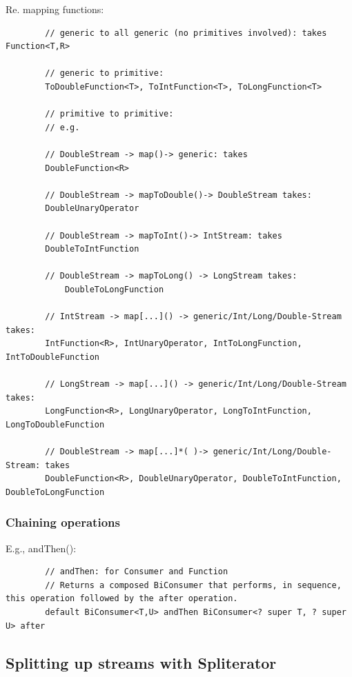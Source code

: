 \documentclass{scrartcl}
\begin{document}
    Re. mapping functions:

    \begin{lstlisting}
        // generic to all generic (no primitives involved): takes Function<T,R>

        // generic to primitive:
        ToDoubleFunction<T>, ToIntFunction<T>, ToLongFunction<T>

        // primitive to primitive:
        // e.g.

        // DoubleStream -> map()-> generic: takes
        DoubleFunction<R>

        // DoubleStream -> mapToDouble()-> DoubleStream takes:
        DoubleUnaryOperator

        // DoubleStream -> mapToInt()-> IntStream: takes
        DoubleToIntFunction

        // DoubleStream -> mapToLong() -> LongStream takes:
            DoubleToLongFunction

        // IntStream -> map[...]() -> generic/Int/Long/Double-Stream takes:
        IntFunction<R>, IntUnaryOperator, IntToLongFunction, IntToDoubleFunction

        // LongStream -> map[...]() -> generic/Int/Long/Double-Stream takes:
        LongFunction<R>, LongUnaryOperator, LongToIntFunction, LongToDoubleFunction

        // DoubleStream -> map[...]*( )-> generic/Int/Long/Double-Stream: takes
        DoubleFunction<R>, DoubleUnaryOperator, DoubleToIntFunction, DoubleToLongFunction
    \end{lstlisting}

\subsubsection{Chaining operations}

    E.g., andThen():

    \begin{lstlisting}
        // andThen: for Consumer and Function
        // Returns a composed BiConsumer that performs, in sequence, this operation followed by the after operation.
        default BiConsumer<T,U> andThen BiConsumer<? super T, ? super U> after
    \end{lstlisting}

\subsection{Splitting up streams with Spliterator}
\end{document}
